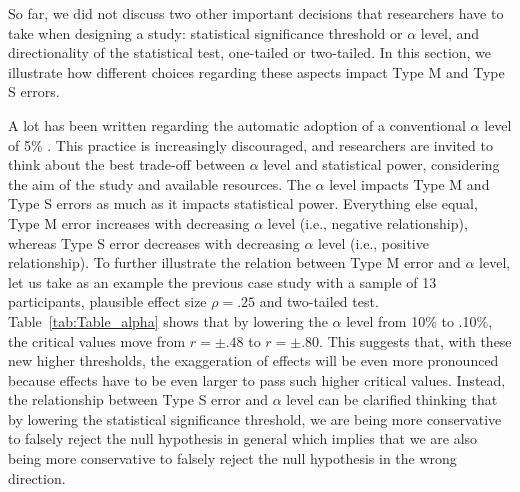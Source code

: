 \documentclass{article}\usepackage[]{graphicx}\usepackage[]{color}
\begin{document}
So far, we did not discuss two other important decisions that researchers have to take when designing a study: statistical significance threshold or $\alpha$ level, and directionality of the statistical test, one-tailed or two-tailed. In this section, we illustrate how different choices regarding these aspects impact Type M and Type S errors.

A lot has been written regarding the automatic adoption of a conventional $\alpha$ level of 5\% \parencite[e.g.,][]{gigerenzerNullRitualWhat2004, lakensJustifyYourAlpha2018}. This practice is increasingly discouraged, and researchers are invited to think about the best trade-off between $\alpha$ level and statistical power, considering the aim of the study and available resources. The $\alpha$ level impacts Type M and Type S errors as much as it impacts statistical power. Everything else equal, Type M error increases with decreasing $\alpha$ level (i.e., negative relationship), whereas Type S error decreases with decreasing $\alpha$ level (i.e., positive relationship). To further illustrate the relation between Type M error and $\alpha$ level, let us take as an example the previous case study with a sample of 13 participants, plausible effect size $\rho=.25$ and two-tailed test. Table~\ref{tab:Table_alpha} shows that by lowering the $\alpha$ level from 10\% to .10\%, the critical values move from $r=\pm .48$  to $r=\pm .80$. This suggests that, with these new higher thresholds, the exaggeration of effects will be even more pronounced because effects have to be even larger to pass such higher critical values. Instead, the relationship between Type S error and $\alpha$ level can be clarified thinking that by lowering the statistical significance threshold, we are being more conservative to falsely reject the null hypothesis in general which implies that we are also being more conservative to falsely reject the null hypothesis in the wrong direction.
\end{document}
